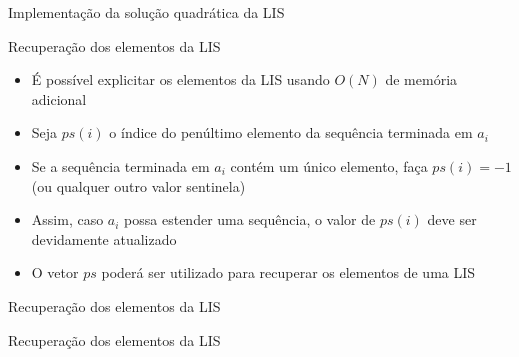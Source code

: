 \begin{frame}[fragile]{Implementação da solução quadrática da LIS}
\end{frame}

\begin{frame}[fragile]{Recuperação dos elementos da LIS}

    \begin{itemize}
        \item É possível explicitar os elementos da LIS usando $O(N)$ de memória
            adicional

        \item Seja $ps(i)$ o índice do penúltimo elemento da sequência terminada em
            $a_i$

        \item Se a sequência terminada em $a_i$ contém um único elemento, faça
            $ps(i) = -1$ (ou qualquer outro valor sentinela)

        \item Assim, caso $a_i$ possa estender uma sequência, o valor de $ps(i)$ deve
            ser devidamente atualizado

        \item O vetor $ps$ poderá ser utilizado para recuperar os elementos de uma LIS
    \end{itemize}

\end{frame}

\begin{frame}[fragile]{Recuperação dos elementos da LIS}
\end{frame}

\begin{frame}[fragile]{Recuperação dos elementos da LIS}
\end{frame}

